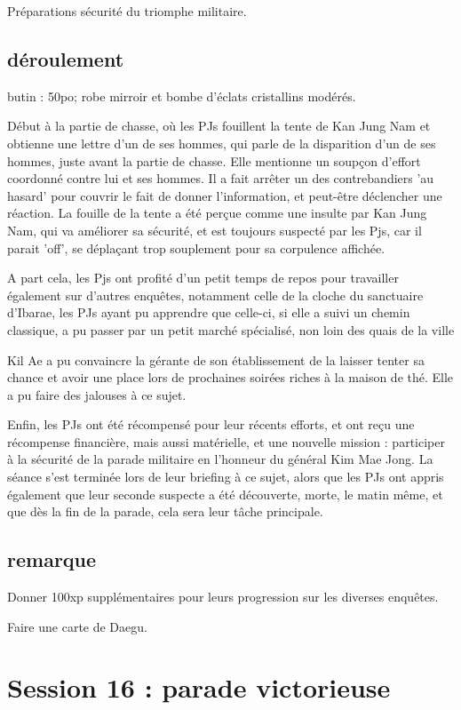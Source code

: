 \documentclass[10pt,a4paper]{book}
\begin{document}
Préparations sécurité du triomphe militaire.
\subsection{déroulement}
butin : 50po; robe mirroir et bombe d'éclats cristallins modérés.

Début à la partie de chasse, où les PJs fouillent la tente de Kan Jung Nam et obtienne une lettre d'un de ses hommes, qui parle de la disparition d'un de ses hommes, juste avant la partie de chasse. Elle mentionne un soupçon d'effort coordonné contre lui et ses hommes. Il a fait arrêter un des contrebandiers 'au hasard' pour couvrir le fait de donner l'information, et peut-être déclencher une réaction. La fouille de la tente a été perçue comme une insulte par Kan Jung Nam, qui va améliorer sa sécurité, et est toujours suspecté par les Pjs, car il parait 'off', se déplaçant trop souplement pour sa corpulence affichée.

A part cela, les Pjs ont profité d'un petit temps de repos pour travailler également sur d'autres enquêtes, notamment celle de la cloche du sanctuaire d'Ibarae, les PJs ayant pu apprendre que celle-ci, si elle a suivi un chemin classique, a pu passer par un petit marché spécialisé, non loin des quais de la ville

Kil Ae a pu convaincre la gérante de son établissement de la laisser tenter sa chance et avoir une place lors de prochaines soirées riches à la maison de thé. Elle a pu faire des jalouses à ce sujet.

Enfin, les PJs ont été récompensé pour leur récents efforts, et ont reçu une récompense financière, mais aussi matérielle, et une nouvelle mission : participer à la sécurité de la parade militaire en l'honneur du général Kim Mae Jong. La séance s'est terminée lors de leur briefing à ce sujet, alors que les PJs ont appris également que leur seconde suspecte a été découverte, morte, le matin même, et que dès la fin de la parade, cela sera leur tâche principale.
\subsection{remarque}
Donner 100xp supplémentaires pour leurs progression sur les diverses enquêtes.

Faire une carte de Daegu.

\section{Session 16 : parade victorieuse}
\end{document}
